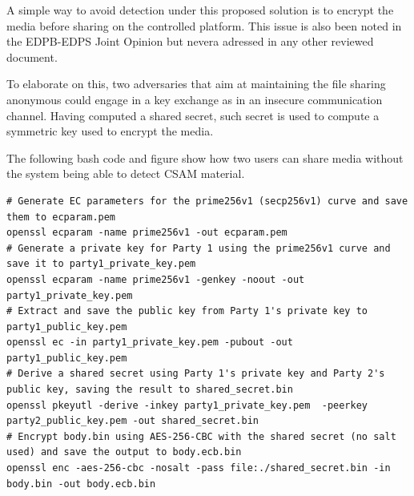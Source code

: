 A simple way to avoid detection under this proposed solution is to encrypt the media before sharing on the controlled platform. This issue is also been noted in the EDPB-EDPS Joint Opinion\cite{Joint} but nevera adressed in any other reviewed document.

To elaborate on this, two adversaries that aim at maintaining the file sharing anonymous could engage in a key exchange as in an insecure communication channel. Having computed a shared secret, such secret is used to compute a symmetric key used to encrypt the media.

The following bash code and figure show how two users can share media without the system being able to detect CSAM material.
\\
\begin{minipage}{0.5\textwidth}


    \begin{lstlisting}
# Generate EC parameters for the prime256v1 (secp256v1) curve and save them to ecparam.pem
openssl ecparam -name prime256v1 -out ecparam.pem
# Generate a private key for Party 1 using the prime256v1 curve and save it to party1_private_key.pem
openssl ecparam -name prime256v1 -genkey -noout -out party1_private_key.pem
# Extract and save the public key from Party 1's private key to party1_public_key.pem
openssl ec -in party1_private_key.pem -pubout -out party1_public_key.pem
# Derive a shared secret using Party 1's private key and Party 2's public key, saving the result to shared_secret.bin
openssl pkeyutl -derive -inkey party1_private_key.pem  -peerkey party2_public_key.pem -out shared_secret.bin
# Encrypt body.bin using AES-256-CBC with the shared secret (no salt used) and save the output to body.ecb.bin
openssl enc -aes-256-cbc -nosalt -pass file:./shared_secret.bin -in body.bin -out body.ecb.bin
    \end{lstlisting}
\end{minipage}%
\hfill
